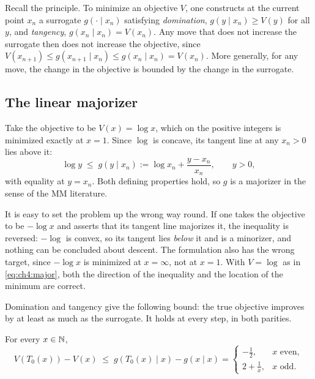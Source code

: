 Recall the principle.  To minimize an objective $V$, one constructs at the
current point $x_n$ a surrogate $g(\cdot\mid x_n)$ satisfying
\emph{domination}, $g(y\mid x_n)\ge V(y)$ for all $y$, and \emph{tangency},
$g(x_n\mid x_n)=V(x_n)$.  Any move that does not increase the surrogate then
does not increase the objective, since
$V(x_{n+1})\le g(x_{n+1}\mid x_n)\le g(x_n\mid x_n)=V(x_n)$.  More generally,
for any move, the change in the objective is bounded by the change in the
surrogate.

\subsection{The linear majorizer}

Take the objective to be $V(x)=\log x$, which on the positive integers is
minimized exactly at $x=1$.  Since $\log$ is concave, its tangent line at any
$x_n>0$ lies above it:
\begin{equation}\label{eq:ch4:major}
  \log y\;\le\;g(y\mid x_n):=\log x_n+\frac{y-x_n}{x_n},\qquad y>0,
\end{equation}
with equality at $y=x_n$.  Both defining properties hold, so $g$ is a
majorizer in the sense of the MM literature.

\begin{remark}\label{rem:ch4:minuslog}
It is easy to set the problem up the wrong way round.  If one takes the
objective to be $-\log x$ and asserts that its tangent line majorizes it, the
inequality is reversed: $-\log$ is convex, so its tangent lies \emph{below} it
and is a minorizer, and nothing can be concluded about descent.  The
formulation also has the wrong target, since $-\log x$ is minimized at
$x=\infty$, not at $x=1$.  With $V=\log$ as in \eqref{eq:ch4:major}, both the
direction of the inequality and the location of the minimum are correct.
\end{remark}

Domination and tangency give the following bound: the true objective
improves by at least as much as the surrogate.  It holds at every step, in both
parities.

\begin{proposition}\label{prop:mmdescent}
For every $x\in\mathbb{N}$,
\[
  V(T_0(x))-V(x)\;\le\;g(T_0(x)\mid x)-g(x\mid x)
  =\begin{cases}
     -\tfrac12, & x\text{ even},\\[2pt]
     2+\tfrac1x, & x\text{ odd}.
   \end{cases}
\]
\end{proposition}

